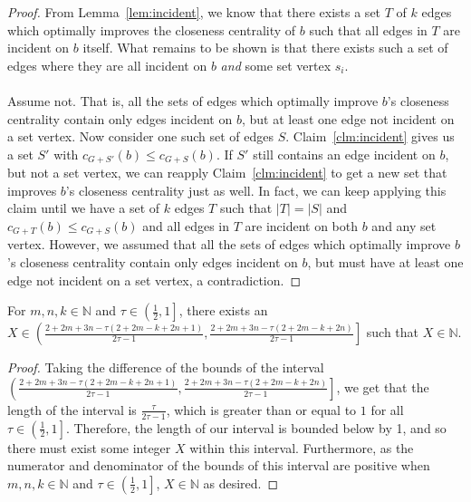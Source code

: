 \begin{proof}
    From Lemma~\ref{lem:incident}, we know that there exists a set $T$ of $k$ edges which optimally improves the closeness centrality of $b$ such that all edges in $T$ are incident on $b$ itself. What remains to be shown is that there exists such a set of edges where they are all incident on $b$ \textit{and} some set vertex $s_i$.\\\\
    Assume not. That is, all the sets of edges which optimally improve $b$'s closeness centrality contain only edges incident on $b$, but at least one edge not incident on a set vertex. Now consider one such set of edges $S$. Claim~\ref{clm:incident} gives us a set $S'$ with $c_{G+S'}(b)\leq c_{G+S}(b)$. If $S'$ still contains an edge incident on $b$, but not a set vertex, we can reapply Claim~\ref{clm:incident} to get a new set that improves $b$'s closeness centrality just as well. In fact, we can keep applying this claim until we have a set of $k$ edges $T$ such that $|T|=|S|$ and $c_{G+T}(b)\leq c_{G+S}(b)$ and all edges in $T$ are incident on both $b$ and any set vertex. However, we assumed that all the sets of edges which optimally improve $b$'s closeness centrality contain only edges incident on $b$, but must have at least one edge not incident on a set vertex, a contradiction. 
\end{proof}

\begin{lemma}\label{lem:integer}
    For $m,n,k\in\mathbb{N}$ and $\tau\in\left(\frac{1}{2},1\right]$, there exists an\\ $X\in\left(\frac{2+2m+3n-\tau(2+2m-k+2n+1)}{2\tau-1},\frac{2+2m+3n-\tau(2+2m-k+2n)}{2\tau-1}\right]$ such that $X\in\mathbb{N}$.
\end{lemma}
\begin{proof}
    Taking the difference of the bounds of the interval\\ $\left(\frac{2+2m+3n-\tau(2+2m-k+2n+1)}{2\tau-1},\frac{2+2m+3n-\tau(2+2m-k+2n)}{2\tau-1}\right]$, we get that the length of the interval is $\frac{\tau}{2\tau-1}$, which is greater than or equal to $1$ for all $\tau\in\left(\frac{1}{2},1\right]$. Therefore, the length of our interval is bounded below by 1, and so there must exist some integer $X$ within this interval. Furthermore, as the numerator and denominator of the bounds of this interval are positive when $m,n,k\in\mathbb{N}$ and $\tau\in\left(\frac{1}{2},1\right]$, $X\in\mathbb{N}$ as desired.
\end{proof}


